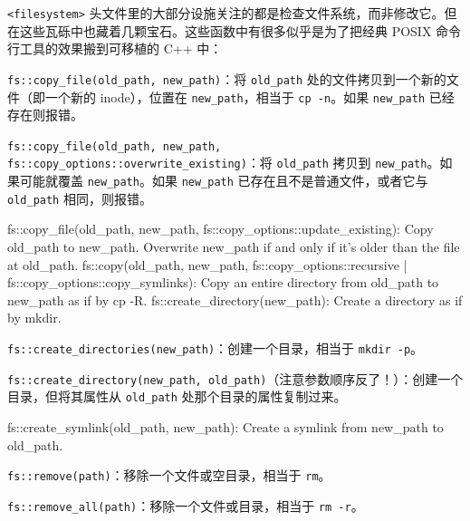 \texttt{<filesystem>\allowbreak{}} 头文件里的大部分设施关注的都是检查文件系统，而非修改它。但在这些瓦砾中也藏着几颗宝石。这些函数中有很多似乎是为了把经典 POSIX 命令行工具的效果搬到可移植的 C++ 中：

\texttt{fs::\allowbreak{}copy\_\allowbreak{}file(\allowbreak{}old\_\allowbreak{}path,\allowbreak{} new\_\allowbreak{}path)\allowbreak{}}：将 \texttt{old\_\allowbreak{}path} 处的文件拷贝到一个新的文件（即一个新的 inode），位置在 \texttt{new\_\allowbreak{}path}，相当于 \texttt{cp -n}。如果 \texttt{new\_\allowbreak{}path} 已经存在则报错。

\texttt{fs::\allowbreak{}copy\_\allowbreak{}file(\allowbreak{}old\_\allowbreak{}path,\allowbreak{} new\_\allowbreak{}path,\allowbreak{}} \texttt{fs::\allowbreak{}copy\_\allowbreak{}options::\allowbreak{}overwrite\_\allowbreak{}existing)\allowbreak{}}：将 \texttt{old\_\allowbreak{}path} 拷贝到 \texttt{new\_\allowbreak{}path}。如果可能就覆盖 \texttt{new\_\allowbreak{}path}。如果 \texttt{new\_\allowbreak{}path} 已存在且不是普通文件，或者它与 \texttt{old\_\allowbreak{}path} 相同，则报错。

\begin{codebox}[cpp]
 fs::copy_file(old_path, new_path,
 fs::copy_options::update_existing): Copy old_path to new_path.
 Overwrite new_path if and only if it's older than the file at old_path.
 fs::copy(old_path, new_path, fs::copy_options::recursive |
 fs::copy_options::copy_symlinks): Copy an entire directory from
 old_path to new_path as if by cp -R.
 fs::create_directory(new_path): Create a directory as if by mkdir.
\end{codebox}

\texttt{fs::\allowbreak{}create\_\allowbreak{}directories(\allowbreak{}new\_\allowbreak{}path)\allowbreak{}}：创建一个目录，相当于 \texttt{mkdir -p}。

\texttt{fs::\allowbreak{}create\_\allowbreak{}directory(\allowbreak{}new\_\allowbreak{}path,\allowbreak{} old\_\allowbreak{}path)\allowbreak{}}（注意参数顺序反了！）：创建一个目录，但将其属性从 \texttt{old\_\allowbreak{}path} 处那个目录的属性复制过来。

\begin{codebox}[cpp]
 fs::create_symlink(old_path, new_path): Create a symlink from
 new_path to old_path.
\end{codebox}

\texttt{fs::\allowbreak{}remove(\allowbreak{}path)\allowbreak{}}：移除一个文件或空目录，相当于 \texttt{rm}。

\texttt{fs::\allowbreak{}remove\_\allowbreak{}all(\allowbreak{}path)\allowbreak{}}：移除一个文件或目录，相当于 \texttt{rm -r}。

